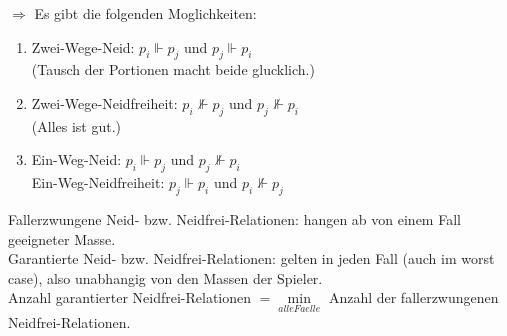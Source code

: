 $\Rightarrow$ Es gibt die folgenden Moglichkeiten:
\begin{enumerate}
 \item Zwei-Wege-Neid: $p_i\Vdash p_j$ und $p_j\Vdash p_i$\\(Tausch der Portionen macht beide glucklich.)
 \item Zwei-Wege-Neidfreiheit: $p_i\nVdash p_j$ und $p_j\nVdash p_i$\\(Alles ist gut.)
 \item Ein-Weg-Neid: $p_i\Vdash p_j$ und $p_j\nVdash p_i$\\
       Ein-Weg-Neidfreiheit: $p_j\Vdash p_i$ und $p_i\nVdash p_j$
\end{enumerate}
Fallerzwungene Neid- bzw. Neidfrei-Relationen: hangen ab von einem Fall geeigneter Masse.\\
Garantierte Neid- bzw. Neidfrei-Relationen: gelten in jeden Fall (auch im worst case), also unabhangig von den Massen der Spieler.\\
Anzahl garantierter Neidfrei-Relationen $=\min\limits_{alle Faelle}$ Anzahl der fallerzwungenen Neidfrei-Relationen.
